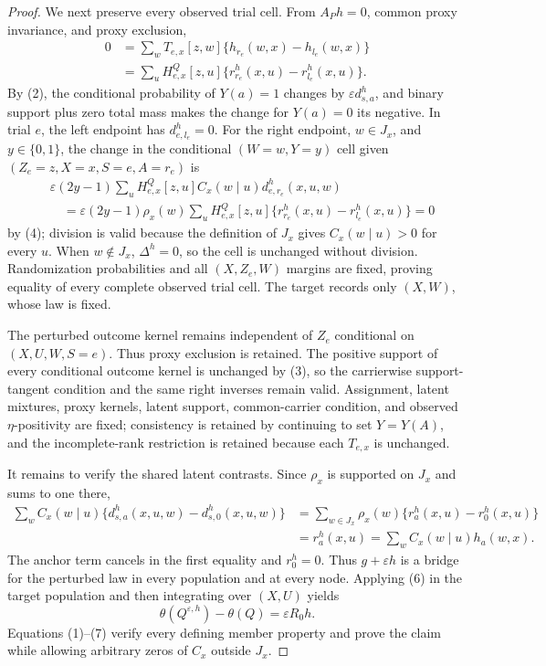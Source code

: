 \documentclass{article}
\begin{document}
\begin{proof}
We next preserve every observed trial cell.  From \(A_Ph=0\), common proxy invariance, and proxy exclusion,
\[
\begin{aligned}
0
&=\sum_wT_{e,x}[z,w]\{h_{r_e}(w,x)-h_{l_e}(w,x)\}\\
&=\sum_uH^Q_{e,x}[z,u]\{r^h_{r_e}(x,u)-r^h_{l_e}(x,u)\}.
\end{aligned}
\tag{4}
\]
By (2), the conditional probability of \(Y(a)=1\) changes by \(\varepsilon d^h_{s,a}\), and binary support plus zero total mass makes the change for \(Y(a)=0\) its negative.  In trial \(e\), the left endpoint has \(d^h_{e,l_e}=0\).  For the right endpoint, \(w\in J_x\), and \(y\in\{0,1\}\), the change in the conditional \((W=w,Y=y)\) cell given \((Z_e=z,X=x,S=e,A=r_e)\) is
\[
\begin{aligned}
&\varepsilon(2y-1)\sum_uH^Q_{e,x}[z,u]C_x(w\mid u)d^h_{e,r_e}(x,u,w)\\
&\quad=\varepsilon(2y-1)\rho_x(w)
\sum_uH^Q_{e,x}[z,u]\{r^h_{r_e}(x,u)-r^h_{l_e}(x,u)\}=0
\end{aligned}
\tag{5}
\]
by (4); division is valid because the definition of \(J_x\) gives \(C_x(w\mid u)>0\) for every \(u\).  When \(w\notin J_x\), \(\Delta^h=0\), so the cell is unchanged without division.  Randomization probabilities and all \((X,Z_e,W)\) margins are fixed, proving equality of every complete observed trial cell.  The target records only \((X,W)\), whose law is fixed.

The perturbed outcome kernel remains independent of \(Z_e\) conditional on \((X,U,W,S=e)\).  Thus proxy exclusion is retained.  The positive support of every conditional outcome kernel is unchanged by (3), so the carrierwise support-tangent condition and the same right inverses remain valid.  Assignment, latent mixtures, proxy kernels, latent support, common-carrier condition, and observed \(\eta\)-positivity are fixed; consistency is retained by continuing to set \(Y=Y(A)\), and the incomplete-rank restriction is retained because each \(T_{e,x}\) is unchanged.

It remains to verify the shared latent contrasts.  Since \(\rho_x\) is supported on \(J_x\) and sums to one there,
\[
\begin{aligned}
\sum_wC_x(w\mid u)\{d^h_{s,a}(x,u,w)-d^h_{s,0}(x,u,w)\}
&=\sum_{w\in J_x}\rho_x(w)\{r^h_a(x,u)-r^h_0(x,u)\}\\
&=r^h_a(x,u)
=\sum_wC_x(w\mid u)h_a(w,x).
\end{aligned}
\tag{6}
\]
The anchor term cancels in the first equality and \(r^h_0=0\).  Thus \(g+\varepsilon h\) is a bridge for the perturbed law in every population and at every node.  Applying (6) in the target population and then integrating over \((X,U)\) yields
\[
\theta(Q^{\varepsilon,h})-\theta(Q)=\varepsilon R_0h.
\tag{7}
\]
Equations (1)--(7) verify every defining member property and prove the claim while allowing arbitrary zeros of \(C_x\) outside \(J_x\).
\end{proof}
\end{document}
